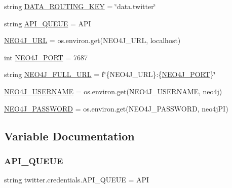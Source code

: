 \begin{DoxyCompactItemize}
string \hyperlink{namespacetwitter_1_1credentials_a68d9801315dcf6c73cf742403b8703be}{D\+A\+T\+A\+\_\+\+R\+O\+U\+T\+I\+N\+G\+\_\+\+K\+EY} = \char`\"{}data.\+twitter\char`\"{}
\item 
string \hyperlink{namespacetwitter_1_1credentials_a451867ef4046d3421650fa5a49ae6c27}{A\+P\+I\+\_\+\+Q\+U\+E\+UE} = \textquotesingle{}A\+PI\textquotesingle{}
\item 
\hyperlink{namespacetwitter_1_1credentials_a08ad8fdbe4b3a4d363b457f4778e01e4}{N\+E\+O4\+J\+\_\+\+U\+RL} = os.\+environ.\+get(\textquotesingle{}N\+E\+O4\+J\+\_\+\+U\+RL\textquotesingle{}, \textquotesingle{}localhost\textquotesingle{})
\item 
int \hyperlink{namespacetwitter_1_1credentials_a4a2ba4f655916e3ab1060e5220728e97}{N\+E\+O4\+J\+\_\+\+P\+O\+RT} = 7687
\item 
string \hyperlink{namespacetwitter_1_1credentials_a9c0ee55af92e6f4a3637ffcd33c4f250}{N\+E\+O4\+J\+\_\+\+F\+U\+L\+L\+\_\+\+U\+RL} = f\char`\"{}\{N\+E\+O4\+J\+\_\+\+U\+RL\}\+:\{\hyperlink{namespacetwitter_1_1credentials_a4a2ba4f655916e3ab1060e5220728e97}{N\+E\+O4\+J\+\_\+\+P\+O\+RT}\}\char`\"{}
\item 
\hyperlink{namespacetwitter_1_1credentials_abe15ff82f133a4fbfbac7d756721c154}{N\+E\+O4\+J\+\_\+\+U\+S\+E\+R\+N\+A\+ME} = os.\+environ.\+get(\textquotesingle{}N\+E\+O4\+J\+\_\+\+U\+S\+E\+R\+N\+A\+ME\textquotesingle{}, \textquotesingle{}neo4j\textquotesingle{})
\item 
\hyperlink{namespacetwitter_1_1credentials_addac25c7832541ec9baaa260e5990834}{N\+E\+O4\+J\+\_\+\+P\+A\+S\+S\+W\+O\+RD} = os.\+environ.\+get(\textquotesingle{}N\+E\+O4\+J\+\_\+\+P\+A\+S\+S\+W\+O\+RD\textquotesingle{}, \textquotesingle{}neo4j\+PI\textquotesingle{})
\end{DoxyCompactItemize}


\subsection{Variable Documentation}
\mbox{\label{namespacetwitter_1_1credentials_a451867ef4046d3421650fa5a49ae6c27}} 
\subsubsection{\texorpdfstring{A\+P\+I\+\_\+\+Q\+U\+E\+UE}{API\_QUEUE}}
{\footnotesize\ttfamily string twitter.\+credentials.\+A\+P\+I\+\_\+\+Q\+U\+E\+UE = \textquotesingle{}A\+PI\textquotesingle{}}

